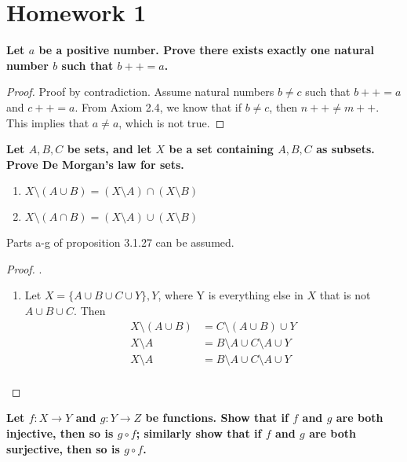 \documentclass[12pt]{article}
\newenvironment{problem}[2][Problem]{\begin{trivlist}
     \item[\hskip \labelsep {\bfseries #1}\hskip \labelsep {\bfseries #2.}]\bfseries}
{\end{trivlist}}
\begin{document}
\section*{Homework 1}

\begin{problem}{2.2.2}
Let $a$ be a positive number. Prove there exists exactly one natural number $b$ such that $b++ = a$.
\end{problem}

\begin{proof}
  Proof by contradiction. Assume natural numbers $b \neq c$ such that $b++ = a$ and $c++ = a$. From Axiom 2.4, we know that if $b \neq c$, then $n++ \neq m++$. This implies that $a \neq a$, which is not true.
\end{proof}

\begin{problem}{3.1.6}
Let $A, B, C$ be sets, and let $X$ be a set containing $A, B, C$ as subsets. Prove De Morgan's law for sets.
\begin{enumerate}
    \item $X \setminus (A \cup B) = (X \setminus A) \cap (X \setminus B)$
    \item $X \setminus (A \cap B) = (X \setminus A) \cup (X \setminus B)$
\end{enumerate}
Parts a-g of proposition 3.1.27 can be assumed.
\end{problem}

\begin{proof}
.
\begin{enumerate}
  \item Let $X = \{A \cup B \cup C \cup Y\}, Y$, where Y is everything else in $X$ that is not $A \cup B \cup C$. Then
  \begin{align*}
    X \setminus (A \cup B) &= C\setminus (A\cup B) \cup Y\\
    X \setminus A &= B\setminus A \cup C\setminus A \cup Y\\
    X \setminus A &= B\setminus A \cup C\setminus A \cup Y\\
  \end{align*}

\end{enumerate}
\end{proof}

\begin{problem}{3.3.2}
Let $f: X \to Y$ and $g: Y \to Z$ be functions. Show that if $f$ and $g$ are both injective, then so is $g \circ f$; similarly show that if $f$ and $g$ are both surjective, then so is $g \circ f$.
\end{problem}
\end{document}
